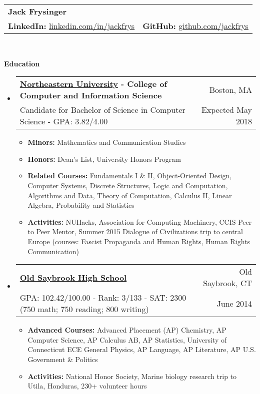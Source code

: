 \documentclass[letterpaper,10.6pt]{article}
\makeatletter
\newcommand{\resitem}[1]{\item #1 \vspace{-2pt}}
\newcommand{\resheading}[1]{{\large \colorbox{mygrey}{\begin{minipage}{\textwidth}{\textbf{#1 \vphantom{p\^{E}}}}\end{minipage}}}}
\newcommand{\ressubheading}[4]{
\begin{tabular*}{6.8in}{l@{\extracolsep{\fill}}r}
		\textbf{#1} & #2 \\
		\small{#3} & \small{#4} \\
\end{tabular*}\vspace{-6pt}}
\makeatother
\begin{document}
\newcommand{\mywebheader}{
\begin{tabular*}{7in}{l@{\extracolsep{\fill}}r}
	\textbf{\LARGE Jack Frysinger} &
	\\\textbf{LinkedIn:} \href{http://linkedin.com/in/jackfrys}{linkedin.com/in/jackfrys} & \textbf{GitHub:} \href{https://github.com/jackfrys}{github.com/jackfrys}
	\end{tabular*}
	\\\vspace{0.1in}}

\mywebheader

\resheading{Education}
	\begin{itemize}[leftmargin=*]
		\item[]
			\ressubheading{\href{http://www.northeastern.edu}{Northeastern University} - College of Computer and Information Science}{Boston, MA}{{Candidate for Bachelor of Science in Computer Science - }{GPA: 3.82/4.00}}{Expected May 2018}
				{ \footnotesize
				\begin{itemize}
					\resitem{\textbf{Minors:} Mathematics and Communication Studies}
					\resitem{\textbf{Honors:} Dean's List, University Honors Program}
					\resitem{\textbf{Related Courses:} Fundamentals I \& II, Object-Oriented Design, Computer Systems, Discrete Structures, Logic and Computation, Algorithms and Data, Theory of Computation, Calculus II, Linear Algebra, Probability and Statistics}
					\resitem{\textbf{Activities:} NUHacks, Association for Computing Machinery, CCIS Peer to Peer Mentor, Summer 2015 Dialogue of Civilizations trip to central Europe (courses: Fascist Propaganda and Human Rights, Human Rights Communication)}
				\end{itemize}}
		\item[]
			\ressubheading{\href{http://www.oldsaybrookschools.org/page.cfm?p=605}{Old Saybrook High School}}{Old Saybrook, CT}{{GPA: 102.42/100.00 - Rank: 3/133 - SAT: 2300 (750 math; 750 reading; 800 writing)}}{June 2014}
			{\footnotesize
			\begin{itemize}
				\resitem{\textbf{Advanced Courses:} Advanced Placement (AP) Chemistry, AP Computer Science, AP Calculus AB, AP Statistics, University of Connecticut ECE General Physics, AP Language, AP Literature, AP U.S. Government \& Politics}
				\resitem{\textbf{Activities:} National Honor Society, Marine biology research trip to Utila, Honduras, 230+ volunteer hours}
			\end{itemize}}
	\end{itemize}
	
\end{document}
